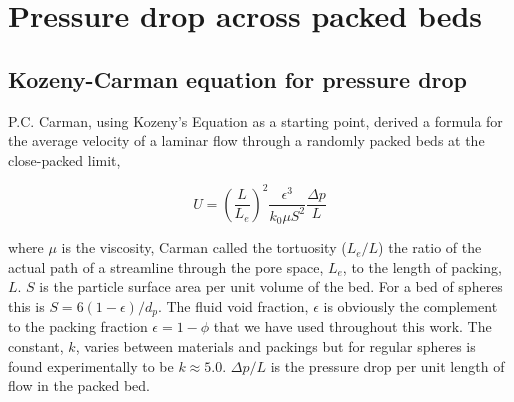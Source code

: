 \section{Pressure drop across packed beds} \label{sec:modeling-pressure-drop}






%
\subsection{Kozeny-Carman equation for pressure drop}
P.C. Carman\cite{Carman1997}, using Kozeny's Equation as a starting point, derived a formula for the average velocity of a laminar flow through a randomly packed beds at the close-packed limit,

\begin{equation}\label{eq:K-C-velocity}
	U = \left(\frac{L}{L_e}\right)^2\frac{\epsilon^3}{k_0\mu S^2}\frac{\Delta p}{L}
\end{equation}

where $\mu$ is the viscosity, Carman called the tortuosity ($L_e/L$) the ratio of the actual path of a streamline through the pore space, $L_e$, to the length of packing, $L$. $S$ is the particle surface area per unit volume of the bed. For a bed of spheres this is $S = 6(1-\epsilon)/d_p$. The fluid void fraction, $\epsilon$ is obviously the complement to the packing fraction $\epsilon = 1 - \phi$ that we have used throughout this work. The constant, $k$, varies between materials and packings but for regular spheres is found experimentally to be $k\approx 5.0$. $\Delta p/L$ is the pressure drop per unit length of flow in the packed bed.

